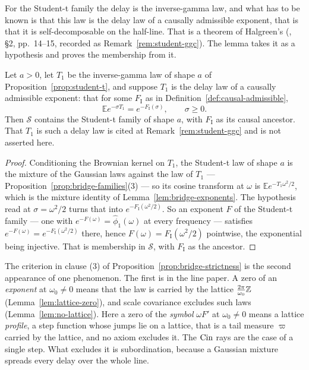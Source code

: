 For the Student-t family the delay is the inverse-gamma law, and what has to be known is that
this law is the delay law of a causally admissible exponent, that is that it is
self-decomposable on the half-line. That is a theorem of Halgreen's
(, \S2, pp.~14--15, recorded as Remark~\ref{rem:student-ggc}). The
lemma takes it as a hypothesis and proves the membership from it.

\begin{lemma}\label{lem:student-subordinated}
Let $a > 0$, let $T_1$ be the inverse-gamma law of shape $a$ of
Proposition~\ref{prop:student-t}, and suppose $T_1$ is the delay law of a causally admissible
exponent: that for some $F_{\mathrm I}$ as in Definition~\ref{def:causal-admissible},
\[
  \mathbb{E}e^{-\sigma T_1} = e^{-F_{\mathrm I}(\sigma)}, \qquad \sigma \ge 0 .
\]
Then $\mathcal{S}$ contains the Student-t family of shape $a$, with $F_{\mathrm I}$ as its causal
ancestor. That $T_1$ is such a delay law is cited at Remark~\ref{rem:student-ggc} and is not
asserted here.
\end{lemma}

\begin{proof}
Conditioning the Brownian kernel on $T_1$, the Student-t law of shape $a$ is the mixture of the
Gaussian laws against the law of $T_1$ --- Proposition~\ref{prop:bridge-families}(3) --- so its
cosine transform at $\omega$ is $\mathbb{E}e^{-T_1\omega^2/2}$, which is the mixture identity of
Lemma~\ref{lem:bridge-exponents}. The hypothesis read at $\sigma = \omega^2/2$ turns that into
$e^{-F_{\mathrm I}(\omega^2/2)}$. So an exponent $F$ of the Student-t family --- one with
$e^{-F(\omega)} = \hat\phi_1(\omega)$ at every frequency --- satisfies
$e^{-F(\omega)} = e^{-F_{\mathrm I}(\omega^2/2)}$ there, hence
$F(\omega) = F_{\mathrm I}(\omega^2/2)$ pointwise, the exponential being injective. That is
membership in $\mathcal{S}$, with $F_{\mathrm I}$ as the ancestor.
\end{proof}

The criterion in clause (3) of Proposition~\ref{prop:bridge-strictness} is the second
appearance of one phenomenon. The first is in the line paper. A zero of an \emph{exponent} at
$\omega_0 \ne 0$ means that the law is carried by the lattice $\tfrac{2\pi}{\omega_0}\mathbb{Z}$
(Lemma~\ref{lem:lattice-zero}), and scale covariance excludes such laws
(Lemma~\ref{lem:no-lattice}). Here a zero of the \emph{symbol} $\omega F'$ at $\omega_0 \ne 0$
means a lattice \emph{profile}, a step function whose jumps lie on a lattice, that is a tail
measure $\varpi$ carried by the lattice, and no axiom excludes it. The $\operatorname{Cin}$ rays are the
case of a single step. What excludes it is subordination, because a Gaussian mixture spreads
every delay over the whole line.

